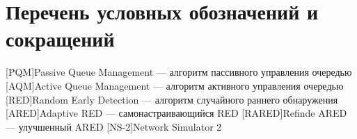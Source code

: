 
\label{abbrv}
\chapter*{Перечень условных обозначений и сокращений}


\begin{acronym}
        [PQM]{Passive Queue Management --- алгоритм пассивного управления очередью}
        [AQM]{Active Queue Management --- алгоритм активного управления очередью}
        [RED]{Random Early Detection --- алгоритм случайного раннего обнаружения}
        [ARED]{Adaptive RED --- самонастраивающийся RED}
        [RARED]{Refinde ARED --- улучшенный ARED}
        [NS-2]{Network Simulator 2}
\end{acronym}


\newpage
